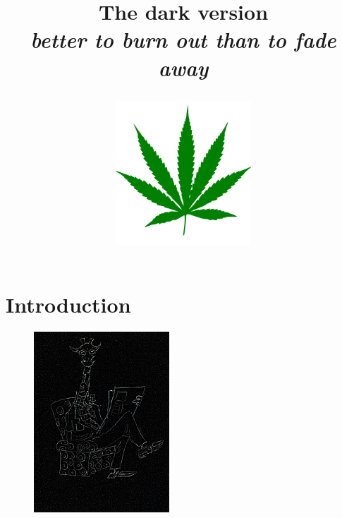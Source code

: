 \documentclass[12pt]{book}
\title{The dark version\\ \textit{better to burn out than to fade away}
\begin{center}\includegraphics[width=2in]{org/art/cannabis.png}\end{center}
}
\begin{document}
\maketitle


\chapter{Introduction}

\begin{figure}
\begin{center}\includegraphics[width=2in]{org/art/takingHelp.png}\end{center}
\end{figure}
\end{document}
